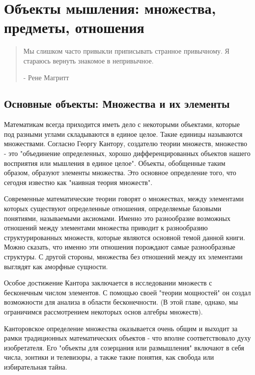 \section{Объекты мышления: множества, предметы, отношения}
\begin{quotation}
  Мы слишком часто привыкли приписывать странное привычному. Я стараюсь вернуть знакомое в непривычное.

  - Рене Магритт
\end{quotation}
\subsection{Основные объекты: Множества и их элементы}
Математикам всегда приходится иметь дело с некоторыми объектами, которые под разными углами складываются в единое целое. Такие единицы называются множествами. Согласно Георгу Кантору, создателю теории множеств, множество - это "объединение определенных, хорошо дифференцированных объектов нашего восприятия или мышления в единое целое". Объекты, обобщенные таким образом, образуют элементы множества. Это основное определение того, что сегодня известно как "наивная теория множеств".

Современные математические теории говорят о множествах, между элементами которых существуют определенные отношения, определяемые базовыми понятиями, называемыми аксиомами. Именно это разнообразие возможных отношений между элементами множества приводит к разнообразию структурированных множеств, которые являются основной темой данной книги. Можно сказать, что именно эти отношения порождают самые разнообразные структуры. С другой стороны, множества без отношений между их элементами выглядят как аморфные сущности.

Особое достижение Кантора заключается в исследовании множеств с бесконечным числом элементов. С помощью своей "теории мощностей" он создал возможности для анализа в области бесконечности. (В этой главе, однако, мы ограничимся рассмотрением некоторых основ алгебры множеств).

Канторовское определение множества оказывается очень общим и выходит за рамки традиционных математических объектов - что вполне соответствовало духу изобретателя. Его "объекты для созерцания или размышления" включают в себя числа, зонтики и телевизоры, а также такие понятия, как свобода или избирательная тайна.

